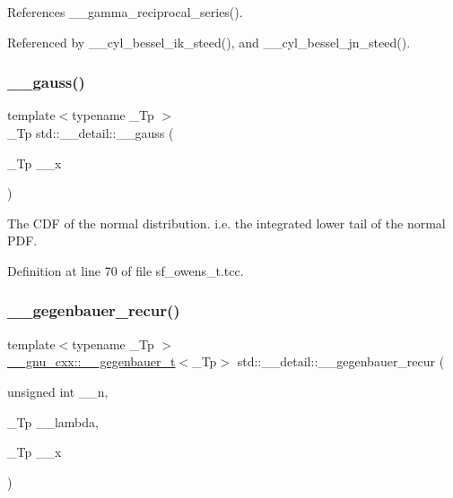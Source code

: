 References \+\_\+\+\_\+gamma\+\_\+reciprocal\+\_\+series().



Referenced by \+\_\+\+\_\+cyl\+\_\+bessel\+\_\+ik\+\_\+steed(), and \+\_\+\+\_\+cyl\+\_\+bessel\+\_\+jn\+\_\+steed().

\mbox{\label{namespacestd_1_1____detail_afdb25beb2328b74d64d9be03de64c442}} 
\subsubsection{\texorpdfstring{\+\_\+\+\_\+gauss()}{\_\_gauss()}}
{\footnotesize\ttfamily template$<$typename \+\_\+\+Tp $>$ \\
\+\_\+\+Tp std\+::\+\_\+\+\_\+detail\+::\+\_\+\+\_\+gauss (\begin{DoxyParamCaption}\item[{\+\_\+\+Tp}]{\+\_\+\+\_\+x }\end{DoxyParamCaption})}

The C\+DF of the normal distribution. i.\+e. the integrated lower tail of the normal P\+DF. 

Definition at line 70 of file sf\+\_\+owens\+\_\+t.\+tcc.

\mbox{\label{namespacestd_1_1____detail_a34e6b1cce7eca17d0929284577124747}} 
\subsubsection{\texorpdfstring{\+\_\+\+\_\+gegenbauer\+\_\+recur()}{\_\_gegenbauer\_recur()}}
{\footnotesize\ttfamily template$<$typename \+\_\+\+Tp $>$ \\
\hyperlink{struct____gnu__cxx_1_1____gegenbauer__t}{\+\_\+\+\_\+gnu\+\_\+cxx\+::\+\_\+\+\_\+gegenbauer\+\_\+t}$<$\+\_\+\+Tp$>$ std\+::\+\_\+\+\_\+detail\+::\+\_\+\+\_\+gegenbauer\+\_\+recur (\begin{DoxyParamCaption}\item[{unsigned int}]{\+\_\+\+\_\+n,  }\item[{\+\_\+\+Tp}]{\+\_\+\+\_\+lambda,  }\item[{\+\_\+\+Tp}]{\+\_\+\+\_\+x }\end{DoxyParamCaption})}

